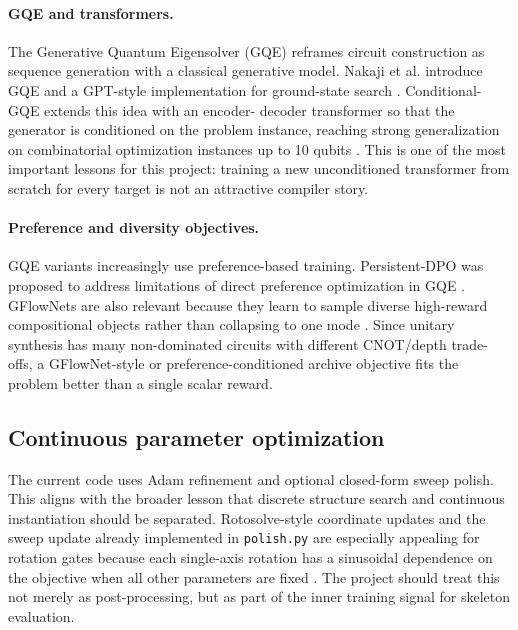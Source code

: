 \documentclass[11pt,a4paper]{article}
\begin{document}
\paragraph{GQE and transformers.}
The Generative Quantum Eigensolver (GQE) reframes circuit construction as
sequence generation with a classical generative model. Nakaji et al. introduce
GQE and a GPT-style implementation for ground-state search
\cite{nakaji2024gqe,nvidia2024gqe}. Conditional-GQE extends this idea with an encoder-
decoder transformer so that the generator is conditioned on the problem
instance, reaching strong generalization on combinatorial optimization
instances up to 10 qubits \cite{minami2025conditional}. This is one of the
most important lessons for this project: training a new unconditioned
transformer from scratch for every target is not an attractive compiler story.

\paragraph{Preference and diversity objectives.}
GQE variants increasingly use preference-based training. Persistent-DPO was
proposed to address limitations of direct preference optimization in GQE
\cite{nakamura2025pdpo}. GFlowNets are also relevant because they learn to
sample diverse high-reward compositional objects rather than collapsing to one
mode \cite{zhang2022gflownet}. Since unitary synthesis has many
non-dominated circuits with different CNOT/depth trade-offs, a GFlowNet-style
or preference-conditioned archive objective fits the problem better than a
single scalar reward.

\subsection{Continuous parameter optimization}

The current code uses Adam refinement and optional closed-form sweep polish.
This aligns with the broader lesson that discrete structure search and
continuous instantiation should be separated. Rotosolve-style coordinate
updates and the sweep update already implemented in \texttt{polish.py} are
especially appealing for rotation gates because each single-axis rotation has
a sinusoidal dependence on the objective when all other parameters are fixed
\cite{ostaszewski2021structure}. The project should treat this not merely as
post-processing, but as part of the inner training signal for skeleton
evaluation.

\end{document}
